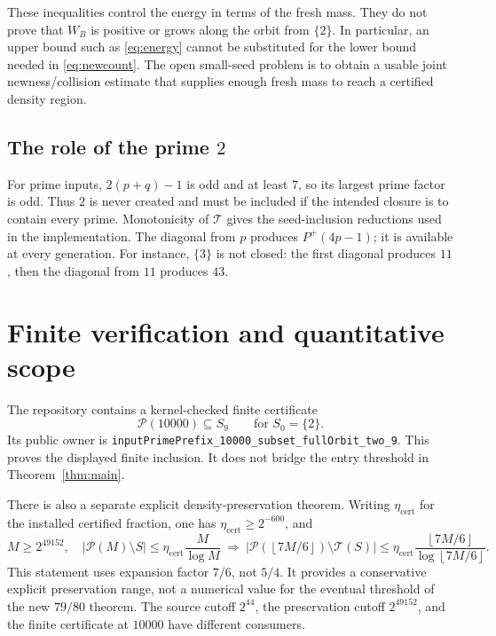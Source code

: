 \documentclass[11pt]{article}
\theoremstyle{definition}
\theoremstyle{remark}
\newcommand{\PP}{\mathcal P}
\newcommand{\cT}{\mathcal T}
\newcommand{\card}[1]{\lvert #1\rvert}
\newcommand{\floor}[1]{\left\lfloor #1\right\rfloor}
\newcommand{\lean}[1]{\nolinkurl{#1}}
\begin{document}
These inequalities control the energy in terms of the fresh mass.
They do not prove that \(W_B\) is positive or grows along the orbit
from \(\{2\}\). In particular, an upper bound such as
\eqref{eq:energy} cannot be substituted for the lower bound needed in
\eqref{eq:newcount}. The open small-seed problem is to obtain a
usable joint newness/collision estimate that supplies enough fresh
mass to reach a certified density region.

\subsection{The role of the prime \(2\)}

For prime inputs, \(2(p+q)-1\) is odd and at least \(7\), so its largest
prime factor is odd. Thus \(2\) is never created and must be included
if the intended closure is to contain every prime. Monotonicity of
\(\cT\) gives the seed-inclusion reductions used in the implementation.
The diagonal from \(p\) produces \(P^{+}(4p-1)\); it is available at
every generation. For instance, \(\{3\}\) is not closed: the first
diagonal produces \(11\), then the diagonal from \(11\) produces \(43\).

\section{Finite verification and quantitative scope}\label{sec:finite}

The repository contains a kernel-checked finite certificate
\[
 \PP(10000)\subseteq S_9\qquad\text{for }S_0=\{2\}.
\]
Its public owner is
\lean{inputPrimePrefix_10000_subset_fullOrbit_two_9}.
This proves the displayed finite inclusion. It does not bridge the
entry threshold in Theorem~\ref{thm:main}.

There is also a separate explicit density-preservation theorem.
Writing \(\eta_{\mathrm{cert}}\) for the installed certified fraction,
one has \(\eta_{\mathrm{cert}}\ge2^{-600}\), and
\[
 M\ge2^{49152},\quad
 \card{\PP(M)\setminus S}\le\eta_{\mathrm{cert}}\frac M{\log M}
 \ \Longrightarrow\
 \card{\PP(\floor{7M/6})\setminus\cT(S)}
 \le\eta_{\mathrm{cert}}\frac{\floor{7M/6}}{\log\floor{7M/6}}.
\]
This statement uses expansion factor \(7/6\), not \(5/4\).
It provides a conservative explicit preservation range, not a numerical
value for the eventual threshold of the new \(79/80\) theorem.
The source cutoff \(2^{44}\), the preservation cutoff \(2^{49152}\),
and the finite certificate at \(10000\) have different consumers.
\end{document}
